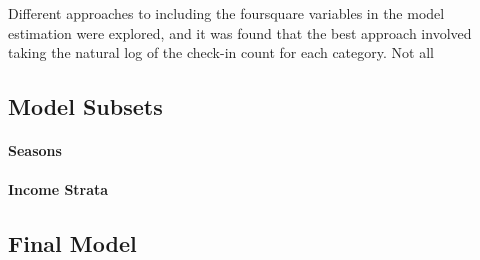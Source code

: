 Different approaches to including the foursquare variables in the model estimation were explored, and it was found that the best approach involved taking the natural log of the check-in count for each category. Not all 



\subsection{Model Subsets}
\paragraph{Seasons}
\paragraph{Income Strata}
\subsection{Final Model}



